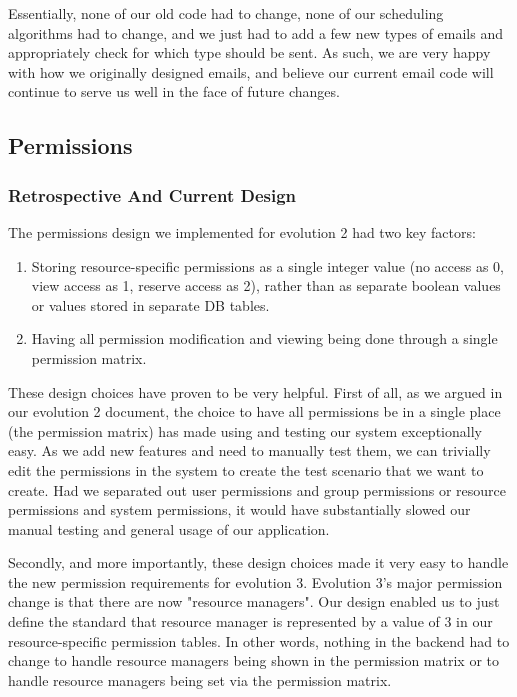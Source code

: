 \documentclass[12pt]{article}
\begin{document}
Essentially, none of our old code had to change, none of our scheduling algorithms had to change, and we just had to add a few new types of emails and appropriately check for which type should be sent. As such, we are very happy with how we originally designed emails, and believe our current email code will continue to serve us well in the face of future changes. 


\subsection{Permissions}
\subsubsection{Retrospective And Current Design}
The permissions design we implemented for evolution 2 had two key factors:
\begin{enumerate}
    \item Storing resource-specific permissions as a single integer value (no access as 0, view access as 1, reserve access as 2), rather than as separate boolean values or values stored in separate DB tables. 
    \item Having all permission modification and viewing being done through a single permission matrix. 
\end{enumerate}

These design choices have proven to be very helpful. First of all, as we argued in our evolution 2 document, the choice to have all permissions be in a single place (the permission matrix) has made using and testing our system exceptionally easy. As we add new features and need to manually test them, we can trivially edit the permissions in the system to create the test scenario that we want to create. Had we separated out user permissions and group permissions or resource permissions and system permissions, it would have substantially slowed our manual testing and general usage of our application. 

Secondly, and more importantly, these design choices made it very easy to handle the new permission requirements for evolution 3. Evolution 3's major permission change is that there are now "resource managers". Our design enabled us to just define the standard that resource manager is represented by a value of 3 in our resource-specific permission tables. In other words, nothing in the backend had to change to handle resource managers being shown in the permission matrix or to handle resource managers being set via the permission matrix. 
\end{document}
